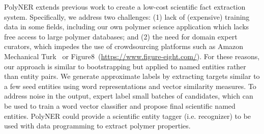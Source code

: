 PolyNER extends previous work to create a low-cost scientific fact extraction system. 
Specifically, we address two challenges: (1) lack of (expensive) training data in some fields, including our own polymer science application which lacks free access to large polymer databases; and (2) the need for domain expert curators, which impedes the use of crowdsourcing platforms such as Amazon Mechanical Turk~\cite{buhrmester2011amazon} or Figure8~(\url{https://www.figure-eight.com/}).
For these reasons, our approach is similar to bootstrapping but applied to named entities rather than entity pairs. 
We generate approximate labels by extracting targets similar to a few seed entities using word representations and vector similarity measures.
To address noise in the output, expert label small batches of candidates, which can be used to train a word vector classifier and propose final scientific named entities.
PolyNER could provide a scientific entity tagger (i.e. recognizer) to be used with data programming to extract polymer properties.
